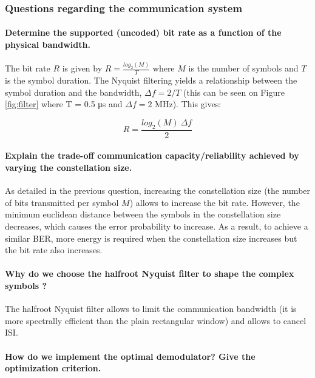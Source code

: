 \subsubsection{Questions regarding the communication system}

\paragraph{Determine the supported (uncoded) bit rate as a function of the physical bandwidth.} \mbox{}

The bit rate $R$ is given by $R = \frac{log_2 (M)}{T}$ where $M$ is the number of symbols and $T$ is the symbol duration. The Nyquist filtering yields a relationship between the symbol duration and the bandwidth, $\Delta f = 2/T$ (this can be seen on Figure \ref{fig:filter} where T = 0.5 \si{\micro \second} and $\Delta f = 2$ \si{\mega \hertz}). This gives:

\begin{equation*}
    R = \frac{log_2 (M) \ \Delta f}{2}
\end{equation*}

\paragraph{Explain the trade-off communication capacity/reliability achieved by varying the constellation size.} \mbox{}

As detailed in the previous question, increasing the constellation size (the number of bits transmitted per symbol $M$) allows to increase the bit rate. However, the minimum euclidean distance between the symbols in the constellation size decreases, which causes the error probability to increase. As a result, to achieve a similar BER, more energy is required when the constellation size increases but the bit rate also increases.

\paragraph{Why do we choose the halfroot Nyquist filter to shape the complex symbols ?} \mbox{}

The halfroot Nyquist filter allows to limit the communication bandwidth (it is more spectrally efficient than the plain rectangular window) and allows to cancel ISI.

\paragraph{How do we implement the optimal demodulator? Give the optimization criterion.} \mbox{}

